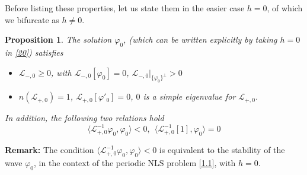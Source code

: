 \documentclass[12pt]{amsart}
\newtheorem{proposition}{Proposition}
\theoremstyle{definition}
\theoremstyle{remark}
\numberwithin{equation}{section}
\renewcommand{\(}{\left(}
\renewcommand{\)}{\right)}
\renewcommand{\[}{\left[}
\renewcommand{\]}{\right]}
\newcommand{\cl}{{\mathcal L}}
\newcommand{\vp}{\varphi}
\newcommand{\dpr}[2]{\langle #1,#2 \rangle}
\begin{document}
 Before listing these properties,  let us state them in the easier case $h=0$, of which we bifurcate as $h\neq 0$.
 \begin{proposition}
 \label{prop:h0}
 The solution $\vp_0$, (which can be written explicitly by taking $h=0$ in \eqref{20}) satisfies
 \begin{itemize}
 \item $\cl_{-,0}\geq 0$, with $\cl_{-,0}[\vp_0]=0$, $\cl_{-,0}|_{\{\vp_0\}^\perp}>0$
 \item $n(\cl_{+,0})=1$, $\cl_{+,0}[\vp'_0]=0$, $0$ is a simple eigenvalue for $\cl_{+,0}$.
 \end{itemize}
 In addition,   the following two relations hold
$$
\dpr{\cl_{+,0}^{-1} \vp_0}{\vp_0}<0, \ \ \dpr{\cl_{+,0}^{-1}[1]}{\vp_0}=0
$$
 \end{proposition}
 {\bf Remark:} The condition $\dpr{\cl_{+,0}^{-1} \vp_0}{\vp_0}<0$ is equivalent to the stability of the wave $\vp_0$, in the context of the periodic NLS problem \eqref{1.1}, with $h=0$.
\end{document}

